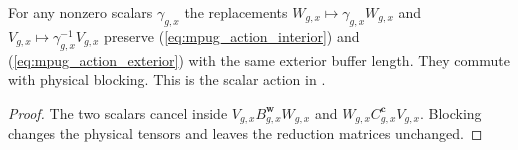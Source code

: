 \begin{lemma}
    \label{lem:mpug_action_scalar_gauge}
    \leanok
    For any nonzero scalars $\gamma_{g,x}$ the replacements
    $W_{g,x}\mapsto\gamma_{g,x}W_{g,x}$ and
    $V_{g,x}\mapsto\gamma_{g,x}^{-1}V_{g,x}$ preserve
    (\ref{eq:mpug_action_interior}) and
    (\ref{eq:mpug_action_exterior}) with the same exterior buffer length.
    They commute with physical blocking. This is the scalar action in
    \cite[lines~1871--1873]{FrancoRubio2025MPUGauging}.
\end{lemma}

\begin{proof}\leanok
    The two scalars cancel inside $V_{g,x}B_{g,x}^{\mathbf w}W_{g,x}$
    and $W_{g,x}C_{g,x}^{\mathbf c}V_{g,x}$. Blocking changes the physical
    tensors and leaves the reduction matrices unchanged.
\end{proof}

